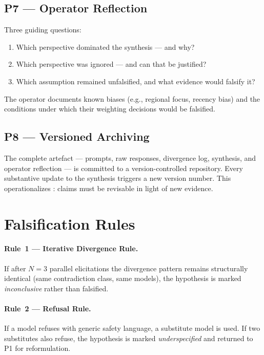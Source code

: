 \documentclass[10pt,a4paper]{article}
\begin{document}
\subsection{P7 — Operator Reflection}
Three guiding questions:
\begin{enumerate}[leftmargin=*, label=(\arabic*)]
  \item Which perspective dominated the synthesis — and why?
  \item Which perspective was ignored — and can that be justified?
  \item Which assumption remained unfalsified, and what evidence would falsify it?
\end{enumerate}
The operator documents known biases (e.g., regional focus, recency bias) and the
conditions under which their weighting decisions would be falsified.

\subsection{P8 — Versioned Archiving}
The complete artefact — prompts, raw responses, divergence log, synthesis, and
operator reflection — is committed to a version-controlled repository. Every
substantive update to the synthesis triggers a new version number. This
operationalizes \citet{popper1959}: claims must be revisable in light of new evidence.

\section{Falsification Rules}
\label{sec:falsrules}

\paragraph{Rule~1 — Iterative Divergence Rule.}
If after $N=3$ parallel elicitations the divergence pattern remains structurally
identical (same contradiction class, same models), the hypothesis is marked
\textit{inconclusive} rather than falsified.

\paragraph{Rule~2 — Refusal Rule.}
If a model refuses with generic safety language, a substitute model is used.
If two substitutes also refuse, the hypothesis is marked \textit{underspecified}
and returned to P1 for reformulation.
\end{document}
